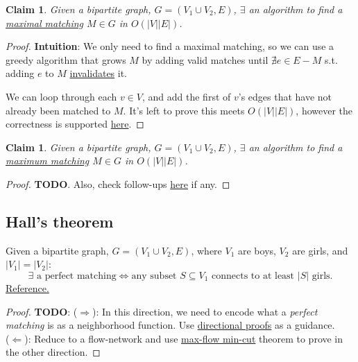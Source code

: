 \documentclass{article}
\newtheorem{claim}[theorem]{Claim}
\theoremstyle{definition}
\begin{document}
\begin{claim}
	Given a bipartite graph, $G = (V_1 \cup V_2, E)$, $\exists$ an algorithm to find a \hyperref[def:maximal_m]{maximal matching} $M \in G$ in $O(|V||E|)$.
\end{claim}

\begin{proof}
	\textbf{Intuition}: We only need to find a maximal matching, so we can use a greedy algorithm that grows $M$ by adding valid matches until $\nexists e \in E-M$ s.t. adding $e$ to $M$ \hyperref[def:match_edge]{invalidates} it.
	
	We can loop through each $v \in V$, and add the first of $v$'s edges that have not already been matched to $M$. It's left to prove this meets $O(|V||E|)$, however the correctness is supported \href{https://www.cs.dartmouth.edu/~ac/Teach/CS105-Winter05/Notes/kavathekar-scribe.pdf}{here}.
\end{proof}

\begin{claim}
	Given a bipartite graph, $G = (V_1 \cup V_2, E)$, $\exists$ an algorithm to find a \hyperref[def:maximum_m]{maximum matching} $M \in G$ in $O(|V||E|)$.
\end{claim}

\begin{proof}
	\textbf{TODO}. Also, check follow-ups \href{https://piazza.com/class/k52uzg6xjkl5xz?cid=705}{here} if any.
\end{proof}

\subsection{Hall's theorem}
Given a bipartite graph, $G = (V_1 \cup V_2, E)$, where $V_1$ are boys, $V_2$ are girls, and $|V_1|=|V_2|$:
$$\exists \text{ a perfect matching} \iff \text{any subset } S \subseteq V_1 \text{ connects to at least } |S| \text{ girls.}$$
\href{https://www2.cs.duke.edu/courses/spring19/compsci230/Notes/lecture14.pdf}{Reference.}

\begin{proof} 
\textbf{TODO}:
($\Rightarrow$): In this direction, we need to encode what a \textit{perfect matching} is as a neighborhood function. Use \href{http://www-cs-students.stanford.edu/~csilvers/proof/node4.html}{directional proofs} as a guidance.
\\($\Leftarrow$): Reduce to a flow-network and use \hyperref[thm:maxflowmincut]{max-flow min-cut} theorem to prove in the other direction.
\end{proof}
\end{document}

